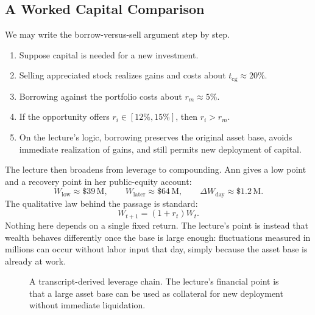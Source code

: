 \subsection{A Worked Capital Comparison}

We may write the borrow-versus-sell argument step by step.

\begin{enumerate}
\item Suppose capital is needed for a new investment.
\item Selling appreciated stock realizes gains and costs about \(t_{\mathrm{cg}} \approx 20\%\).
\item Borrowing against the portfolio costs about \(r_m \approx 5\%\).
\item If the opportunity offers \(r_i \in [12\%,15\%]\), then \(r_i > r_m\).
\item On the lecture's logic, borrowing preserves the original asset base, avoids immediate realization of gains, and still permits new deployment of capital.
\end{enumerate}

The lecture then broadens from leverage to compounding. Ann gives a low point and a recovery point in her public-equity account:
\begin{equation}
W_{\mathrm{low}} \approx \$39\,\mathrm{M},
\qquad
W_{\mathrm{later}} \approx \$64\,\mathrm{M},
\qquad
\Delta W_{\mathrm{day}} \approx \$1.2\,\mathrm{M}.
\end{equation}
The qualitative law behind the passage is standard:
\begin{equation}
W_{t+1} = (1+r_t)W_t.
\end{equation}
Nothing here depends on a single fixed return. The lecture's point is instead that wealth behaves differently once the base is large enough: fluctuations measured in millions can occur without labor input that day, simply because the asset base is already at work.

\begin{figure}[h]
\centering
{}
\caption{A transcript-derived leverage chain. The lecture's financial point is that a large asset base can be used as collateral for new deployment without immediate liquidation.}
\end{figure}

